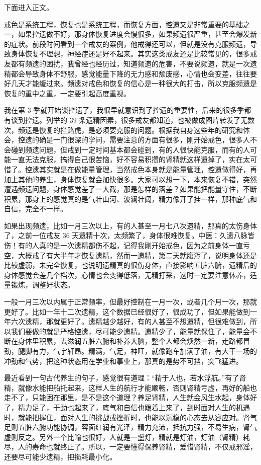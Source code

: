 下面进入正文。

戒色是系统工程，恢复也是系统工程，而恢复方面，控遗又是非常重要的基础之一，如果控遗做不好，那身体恢复进度会慢很多，如果频遗很严重，甚至会爆发新的症状。前段时间看到一个戒友的案例，他戒得还可以，但就是没有克服频遗，导致身体恢复不理想，神经症还是好不起来。其实这类戒友还是比较常见的，很多戒友都有频遗的困扰，我曾经也经历过，知道频遗的危害，不要说频遗，就是一次遗精都会导致身体不舒服，感觉能量下降的无力感和颓废感，心情也会变差，往往要好几天才能缓过来。频遗对戒色和恢复的信心是一种很大的打击，所以克服频遗是恢复的重中之重，一定要引起高度重视。

我在第 3 季就开始谈控遗了，我很早就意识到了控遗的重要性，后来的很多季都有谈到控遗。列举的 39 条遗精因素，很多戒友都知道，也被做成图片转发了无数次，频遗是恢复的拦路虎，是必须要克服的问题。根据我自身这些年的研究和体会，控遗的确是一门很深的学问，需要注意的方面有很多，刚开始戒色，很多人不会碰到频遗问题，但戒到一定时间基本都会碰到，有的人很快能克服，而有的人可能一直无法克服，搞得自己很苦恼，好不容易积攒的肾精就这样遗掉了，实在太可惜了。控遗其实就是在做能量管理，当然戒色本身就是能量管理，控遗做得好，再加上其他的养生，身体恢复就会加快很多。大家可以想一下，本来恢复不错，突然遭遇频遗问题，身体感觉差了一大截，那是怎样的落差？如果能把能量守住，不断积累，那身上的感觉真的是气壮山河、波澜壮阔，精力像开了挂一样，那种底气和自信，完全不一样。

如果出现频遗，比如一月三次以上，有的人甚至一月七八次遗精，那真的太伤身体了，之前一位戒友 36 天遗精十次，太频繁了，身体很难恢复。中医：久遗八脉皆伤！有的人真的是一次遗精都伤不起，记得我刚开始戒色，因为之前身体一直亏空，大概戒了有大半年才恢复遗精，然而一遗精，第二天就腹泻了，说明身体还是比较虚弱，未完全恢复，也说明遗精真的很伤身体，直接影响五脏六腑，遗精后的身体感觉会差几个档次，心情也会变得低落，无精打采，这时一定要注意休养，适量锻炼，调整好状态。

一般一月三次以内属于正常频率，但最好控制在一月一次，或者几个月一次，那就更好了。比如一年十二次遗精，这个数据已经很好了，很成功了，但如果能做到一年六次遗精，那就更好了。遗精越少越好，有的人甚至不想遗精，但很难做到，所以我们要做的就是严格控遗，尽可能少遗精。遗精少了，能量就保住了，能量会不断在身体里积累，去滋润五脏六腑和补养大脑，整个人都会焕然一新，走路都冒劲，腿脚有力，气宇轩昂。精满，气足，神旺，就像跑车加满了油，有大干一场的冲劲和气势，把这种状态用在学业和事业上，那真的是势不可挡，突飞猛进。

最近看到一句古代养生的句子，感觉很有道理：“精于人也，若水浮航。”有了肾精，就像水能把船托起来，这样人生的航行才能顺畅，否则肾精亏虚，再好的船也走不了，只能困在那里，是不是这个道理？养足肾精，人生就会风生水起，身体好了，精力足了，干劲也起来了，底气和自信也跟着上来了，到时面对人生的机遇时，就能把握住，面对人生的挑战或挫折时，也能以沉稳的心态去从容应对。肾气足则五脏六腑功能协调，容面红润有光泽，精力充沛，抵抗力强，不易生病，肾气虚则反之。另外一个比喻也很好，人就是一盏灯，精就是灯油，灯油（肾精）耗尽，人的寿命也就终止了。所以，一定要懂得保养肾精，爱惜肾精，不仅戒邪淫，还要尽可能少遗精，把损耗最小化。

